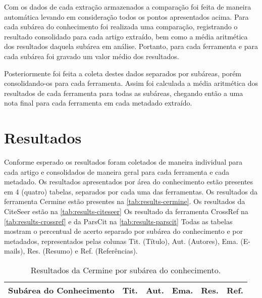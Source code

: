 Com os dados de cada extração armazenados a comparação foi feita de maneira automática levando em consideração todos os pontos apresentados acima. Para cada subárea do conhecimento foi realizada uma comparação, registrando o resultado consolidado para cada artigo extraído, bem como a média aritmética dos resultados daquela subárea em análise. Portanto, para cada ferramenta e para cada subárea foi gravado um valor médio dos resultados.

Posteriormente foi feita a coleta destes dados separados por subáreas, porém consolidando-os para cada ferramenta. Assim foi calculada a média aritmética dos resultados de cada ferramenta para todas as subáreas, chegando então a uma nota final para cada ferramenta em cada metadado extraído.


\section{Resultados}
\label{sec:results}


Conforme esperado os resultados foram coletados de maneira individual para cada artigo e consolidados de maneira geral para cada ferramenta e cada metadado. Os resultados apresentados por área do conhecimento estão presentes em 4 (quatro) tabelas, separados por cada uma das ferramentas. Os resultados da ferramenta Cermine estão presentes na \autoref{tab:results-cermine}. Os resultados da CiteSeer estão na \autoref{tab:results-citeseer} Os resultado da ferramenta CrossRef na \autoref{tab:results-crossref} e da ParsCit na \autoref{tab:results-parscit} Todas as tabelas mostram o percentual de acerto separado por subárea do conhecimento e por metadados, representados pelas colunas Tit. (Título),  Aut. (Autores), Ema. (E-mails), Res. (Resumo) e Ref. (Referências).

\begin{table}
    \caption{Resultados da Cermine por subárea do conhecimento.}
    \begin{center}
        \begin{tabular}{|p{6cm}|C{1.2cm}|C{1.2cm}|C{1.2cm}|C{1.2cm}|C{1.2cm}|}
            \hline 
            \textbf{Subárea do Conhecimento} & \textbf{Tit.} & \textbf{Aut.} & \textbf{Ema.} & \textbf{Res.} & \textbf{Ref.} \\ \hline 
            
        \end{tabular}
    \end{center}
    \label{tab:results-cermine}
\end{table}

